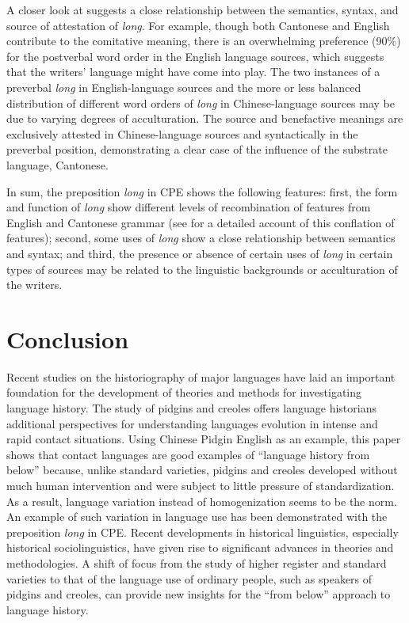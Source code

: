 \documentclass[output=paper]{langsci/langscibook}
\begin{document}
A closer look at  suggests a close relationship between the semantics, syntax, and source of attestation of \textit{long}. For example, though both Cantonese and English contribute to the comitative meaning, there is an overwhelming preference (90\%) for the postverbal word order in the English language sources, which suggests that the writers’ language might have come into play. The two instances of a preverbal \textit{long} in English-language sources and the more or less balanced distribution of different word orders of \textit{long} in Chinese-language sources may be due to varying degrees of acculturation. The source and benefactive meanings are exclusively attested in Chinese-language sources and syntactically in the preverbal position, demonstrating a clear case of the influence of the substrate language, Cantonese. 

In sum, the preposition \textit{long} in CPE shows the following features: first, the form and function of \textit{long} show different levels of recombination of features from English and Cantonese grammar (see \citealt{li_origins_2011} for a detailed account of this conflation of features); second, some uses of \textit{long} show a close relationship between semantics and syntax; and third, the presence or absence of certain uses of \textit{long} in certain types of sources may be related to the linguistic backgrounds or acculturation of the writers.

\section{Conclusion}

Recent studies on the historiography of major languages have laid an important foundation for the development of theories and methods for investigating language history. The study of pidgins and creoles offers language historians additional perspectives for understanding languages evolution in intense and rapid contact situations. Using Chinese Pidgin English as an example, this paper shows that contact languages are good examples of “language history from below” because, unlike standard varieties, pidgins and creoles developed without much human intervention and were subject to little pressure of standardization. As a result, language variation instead of homogenization seems to be the norm. An example of such variation in language use has been demonstrated with the preposition \textit{long} in CPE. Recent developments in historical linguistics, especially historical sociolinguistics, have given rise to significant advances in theories and methodologies. A shift of focus from the study of higher register and standard varieties to that of the language use of ordinary people, such as speakers of pidgins and creoles, can provide new insights for the “from below” approach to language history.




{\sloppy\printbibliography[heading=subbibliography,notkeyword=this]}
\end{document}

